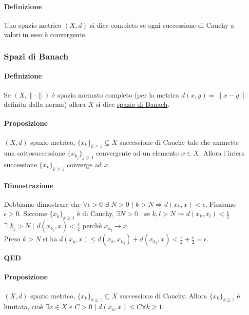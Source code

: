 \documentclass{article}
\begin{document}
\paragraph{{Definizione}}
Uno spazio metrico $(X,d)$ si dice completo se ogni successione di Cauchy a valori in esso è convergente.

\subsubsection{Spazi di Banach}
\paragraph{{Definizione}}
Se $(X, \|\cdot  \|)$ è spazio normato completo (per la metrica $d(x,y)=\|x-y\|$ definita dalla norma) allora $X$ si dice \underline{spazio di Banach}.

\paragraph{{Proposizione}}
$(X,d)$ spazio metrico, $\{x_k\}_{k \geq 1} \subseteq X$ successione di Cauchy tale che ammette una sottosuccessione $\{x_{k_j}\}_{j\geq 1}$ convergente ad un elemento $x \in X$. Allora l'intera successione $\{x_k\}_{k\geq 1}$ converge ad $x$.

\paragraph{{Dimostrazione}}
Dobbiamo dimostrare che $\forall \epsilon >0 \,\,\exists \,\, N >0 \,\,|\,\, k > N \Rightarrow d(x_k,x)< \epsilon$. Fissiamo $\epsilon >0$. Siccome $\{x_k\}_{k\geq 1}$ è di Cauchy, $\exists N >0 \,\, |$ se  $k,l >N \Rightarrow d(x_k,x_l)< \frac{\epsilon}{2}$\\
$\exists \,\, k_j > N \,\,|\,\, d(x_{k_j},x)< \frac{\epsilon}{2}$ perchè $x_{k_j} \rightarrow x$\\
Preso $k > N$ si ha $d(x_k, x)\leq d(x_k,x_{k_j})+d(x_{k_j},x)<\frac{\epsilon}{2}+\frac{\epsilon}{2}=\epsilon$.
\begin{flushright}
\textbf{QED}
\end{flushright}

\paragraph{{Proposizione}}
$(X,d)$ spazio metrico, $\{x_k\}_{k \geq 1} \subseteq X$ successione di Cauchy. Allora $\{x_k\}_{k \geq 1}$ è limitata, cioè $\exists x \in X$ e $C >0 \,\, |\,\, d(x_k,x)\leq C \forall k \geq 1$.
\end{document}
